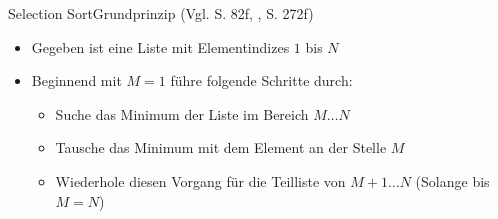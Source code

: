 \begin{frame}{Selection Sort}{Grundprinzip (Vgl. \cite{ottmann2017} S. 82f, \cite{wayne2014}, S. 272f)}
    \begin{itemize}
        \item Gegeben ist eine Liste mit Elementindizes $1$ bis $N$
        \item Beginnend mit $M=1$ führe folgende Schritte durch:
        \begin{itemize}
            \item Suche das Minimum der Liste im Bereich $M\ldots N$
            \item Tausche das Minimum mit dem Element an der Stelle $M$
            \item Wiederhole diesen Vorgang für die Teilliste von $M+1\ldots N$ (Solange bis $M=N$)
        \end{itemize}
    \end{itemize}
\end{frame}